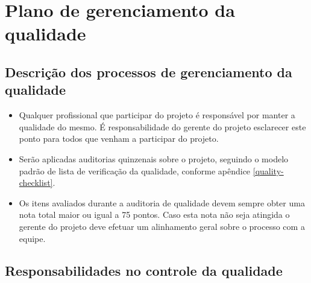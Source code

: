 
\chapter{Plano de gerenciamento da qualidade}

\section{Descrição dos processos de gerenciamento da qualidade}

\begin{itemize}
	\item Qualquer profissional que participar do projeto é responsável por manter a qualidade do mesmo. É responsabilidade do gerente do projeto esclarecer este ponto para todos que venham a participar do projeto.
	\item Serão aplicadas auditorias quinzenais sobre o projeto, seguindo o modelo padrão de lista de verificação da qualidade, conforme apêndice \ref{quality-checklist}.
	\item Os itens avaliados durante a auditoria de qualidade devem sempre obter uma nota total maior ou igual a 75 pontos. Caso esta nota não seja atingida o gerente do projeto deve efetuar um alinhamento geral sobre o processo com a equipe.
\end{itemize}

\section{Responsabilidades no controle da qualidade}

